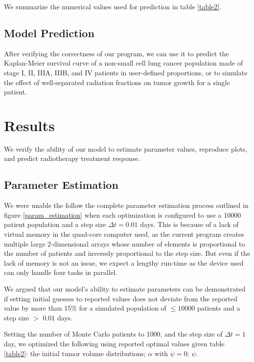 \documentclass[letterpaper
, superscriptaddress
, twocolumn
, aps
]{revtex4}
\begin{document}
We summarize the numerical values used for prediction in table \ref{table2}.

\subsection{Model Prediction}

After verifying the correctness of our program, we can use it to predict the Kaplan-Meier survival curve of a non-small cell lung cancer population made of stage I, II, IIIA, IIIB, and IV patients in user-defined proportions, or to simulate the effect of well-separated radiation fractions on tumor growth for a single patient.

\section{Results}
We verify the ability of our model to estimate parameter values, reproduce plots, and predict radiotherapy treatment response.

\subsection{Parameter Estimation}
We were unable the follow the complete parameter estimation process outlined in figure \ref{param_estimation} when each optimization is configured to use a 10000 patient population and a step size $\Delta t= 0.01$ days. This is because of a lack of virtual memory in the quad-core computer used, as the current program creates multiple large 2-dimensional arrays whose number of elements is proportional to the number of patients and inversely proportional to the step size. But even if the lack of memory is not an issue, we expect a lengthy run-time as the device used can only handle four tasks in parallel.

We argued that our model's ability to estimate parameters can be demonstrated if setting initial guesses to reported values does not deviate from the reported value by more than 15\% for a simulated population of $\leq 10000$ patients and a step size $>$ 0.01 days.

Setting the number of Monte Carlo patients to 1000, and the step size of $\Delta t = 1$ day, we optimized the following using reported optimal values given table \ref{table2}: the initial tumor volume distributions; $\alpha$ with $\psi = 0$; $\psi$.
\end{document}
